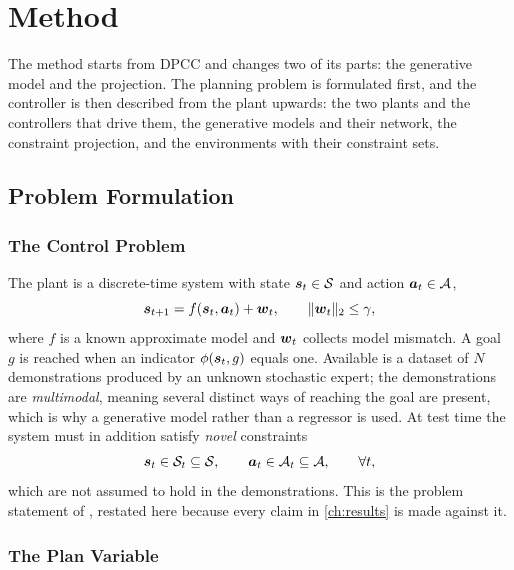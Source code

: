 \chapter{Method}\label{ch:method}

The method starts from \ac{DPCC} and changes two of its parts: the generative model and the projection.
The planning problem is formulated first, and the controller is then described from the plant upwards:
the two plants and the controllers that drive them, the generative models and their network, the
constraint projection, and the environments with their constraint sets.

\section{Problem Formulation}\label{sec:method:formalisation}

\subsection{The Control Problem}

The plant is a discrete-time system with state $\boldsymbol{s}_{t}\in\mathcal{S}$ and action
$\boldsymbol{a}_{t}\in\mathcal{A}$,
\begin{equation}\label{eq:method:plant}
  \boldsymbol{s}_{t+1} = f(\boldsymbol{s}_{t},\boldsymbol{a}_{t}) + \boldsymbol{w}_{t},
  \qquad \|\boldsymbol{w}_{t}\|_{2}\le\gamma,
\end{equation}
where $f$ is a known approximate model and $\boldsymbol{w}_{t}$ collects model mismatch. A goal
$g$ is reached when an indicator $\phi(\boldsymbol{s}_{t},g)$ equals one. Available is a dataset of
$N$ demonstrations produced by an unknown stochastic expert; the demonstrations are
\emph{multimodal}, meaning several distinct ways of reaching the goal are present, which is
why a generative model rather than a regressor is used. At test time the system must in
addition satisfy \emph{novel} constraints
\begin{equation}\label{eq:method:constraints}
  \boldsymbol{s}_{t}\in\mathcal{S}_{t}\subseteq\mathcal{S},
  \qquad \boldsymbol{a}_{t}\in\mathcal{A}_{t}\subseteq\mathcal{A},
  \qquad \forall t,
\end{equation}
which are not assumed to hold in the demonstrations. This is the problem statement of
\parencite[Sec.~3]{romer2025diffusion}, restated here because every claim in \autoref{ch:results} is made
against it.

\subsection{The Plan Variable}

